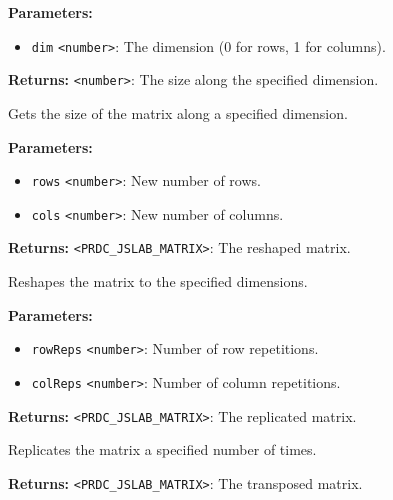 \documentclass[12pt,a4paper]{article}
\begin{document}
\noindent \textbf{Parameters:}
\begin{itemize}
  \item \texttt{dim} \texttt{<number>}: The dimension (0 for rows, 1 for columns).
\end{itemize}

\noindent \textbf{Returns:} \texttt{<number>}: The size along the specified dimension.

\noindent Gets the size of the matrix along a specified dimension.

\vspace{5mm}
\noindent {}


\noindent \textbf{Parameters:}
\begin{itemize}
  \item \texttt{rows} \texttt{<number>}: New number of rows.
  \item \texttt{cols} \texttt{<number>}: New number of columns.
\end{itemize}

\noindent \textbf{Returns:} \texttt{<PRDC\_JSLAB\_MATRIX>}: The reshaped matrix.

\noindent Reshapes the matrix to the specified dimensions.

\vspace{5mm}
\noindent {}


\noindent \textbf{Parameters:}
\begin{itemize}
  \item \texttt{rowReps} \texttt{<number>}: Number of row repetitions.
  \item \texttt{colReps} \texttt{<number>}: Number of column repetitions.
\end{itemize}

\noindent \textbf{Returns:} \texttt{<PRDC\_JSLAB\_MATRIX>}: The replicated matrix.

\noindent Replicates the matrix a specified number of times.

\vspace{5mm}
\noindent {}


\noindent \textbf{Returns:} \texttt{<PRDC\_JSLAB\_MATRIX>}: The transposed matrix.
\end{document}
